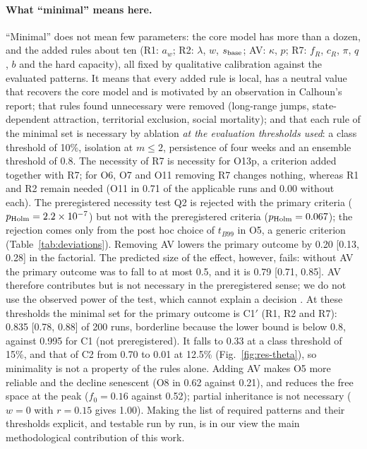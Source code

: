 \paragraph{What ``minimal'' means here.}
``Minimal'' does not mean few parameters: the core model has more than a dozen, and the added rules about ten (R1: $a_w$;
R2: $\lambda$, $w$, $s_{\rm base}$; AV: $\kappa$, $p$; R7: $f_R$, $c_R$, $\pi$, $q$, $b$ and the hard capacity), all
fixed by qualitative calibration against the evaluated patterns. It means that every added rule is local, has a
neutral value that recovers the core model and is motivated by an observation in Calhoun's report; that rules
found unnecessary were removed (long-range jumps, state-dependent attraction, territorial exclusion, social
mortality); and that each rule of the minimal set is necessary by ablation \emph{at the evaluation thresholds used}:
a class threshold of 10\%, isolation at $m\le2$, persistence of four weeks and an ensemble threshold of 0.8.
The necessity of R7 is necessity for O13p, a criterion added together with R7; for O6, O7 and O11 removing R7 changes
nothing, whereas R1 and R2 remain needed (O11 in 0.71 of the applicable runs and 0.00 without each).
The preregistered necessity test Q2 is rejected with the primary criteria ($p_{\rm Holm}=2.2\times10^{-7}$) but not
with the preregistered criteria ($p_{\rm Holm}=0.067$); the rejection comes only from the post hoc choice of $t_{B99}$ in
O5, a generic criterion (Table~\ref{tab:deviations}). Removing AV lowers the primary outcome by 0.20 [0.13, 0.28] in
the factorial. The predicted size of the effect, however, fails: without AV the primary outcome was to fall to at
most 0.5, and it is 0.79 [0.71, 0.85]. AV therefore contributes but is not necessary in the preregistered sense; we
do not use the observed power of the test, which cannot explain a decision \cite{HoenigHeisey2001}.
At these thresholds the minimal set for the primary outcome is \textsf{C1}$'$ (R1, R2 and R7): 0.835 [0.78, 0.88] of
200 runs, borderline because the lower bound is below 0.8, against 0.995 for \textsf{C1} (not preregistered). It falls
to 0.33 at a class threshold of 15\%, and that of
\textsf{C2} from 0.70 to 0.01 at 12.5\% (Fig.~\ref{fig:res-theta}), so minimality is not a property of the rules
alone. Adding AV makes O5 more reliable and the decline senescent (O8 in 0.62 against 0.21), and reduces the free
space at the peak ($f_0=0.16$ against 0.52); partial inheritance is not necessary
($w=0$ with $r=0.15$ gives 1.00). Making the list of required patterns and their thresholds explicit, and testable
run by run, is in our view the main methodological contribution of this work.

